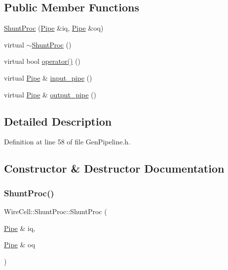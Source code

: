 \subsection*{Public Member Functions}
\begin{DoxyCompactItemize}
\item 
\hyperlink{class_wire_cell_1_1_shunt_proc_ad1f875de67d673c08ba79770a947418d}{Shunt\+Proc} (\hyperlink{namespace_wire_cell_afce9bb01c731347c3d4c8ca9d4ed804f}{Pipe} \&iq, \hyperlink{namespace_wire_cell_afce9bb01c731347c3d4c8ca9d4ed804f}{Pipe} \&oq)
\item 
virtual \hyperlink{class_wire_cell_1_1_shunt_proc_a1056010c4a1d191e09ce5b2c31e97048}{$\sim$\+Shunt\+Proc} ()
\item 
virtual bool \hyperlink{class_wire_cell_1_1_shunt_proc_a6fdf92dd0aa7ca22e8898b3a6802c923}{operator()} ()
\item 
virtual \hyperlink{namespace_wire_cell_afce9bb01c731347c3d4c8ca9d4ed804f}{Pipe} \& \hyperlink{class_wire_cell_1_1_shunt_proc_a64f7a4594c007c4ffd3ea12febaffbfa}{input\+\_\+pipe} ()
\item 
virtual \hyperlink{namespace_wire_cell_afce9bb01c731347c3d4c8ca9d4ed804f}{Pipe} \& \hyperlink{class_wire_cell_1_1_shunt_proc_ad03629b595bca9460788378fc2533518}{output\+\_\+pipe} ()
\end{DoxyCompactItemize}


\subsection{Detailed Description}


Definition at line 58 of file Gen\+Pipeline.\+h.



\subsection{Constructor \& Destructor Documentation}
\mbox{\label{class_wire_cell_1_1_shunt_proc_ad1f875de67d673c08ba79770a947418d}} 
\subsubsection{\texorpdfstring{Shunt\+Proc()}{ShuntProc()}}
{\footnotesize\ttfamily Wire\+Cell\+::\+Shunt\+Proc\+::\+Shunt\+Proc (\begin{DoxyParamCaption}\item[{\hyperlink{namespace_wire_cell_afce9bb01c731347c3d4c8ca9d4ed804f}{Pipe} \&}]{iq,  }\item[{\hyperlink{namespace_wire_cell_afce9bb01c731347c3d4c8ca9d4ed804f}{Pipe} \&}]{oq }\end{DoxyParamCaption})\hspace{0.3cm}{\ttfamily [inline]}}



